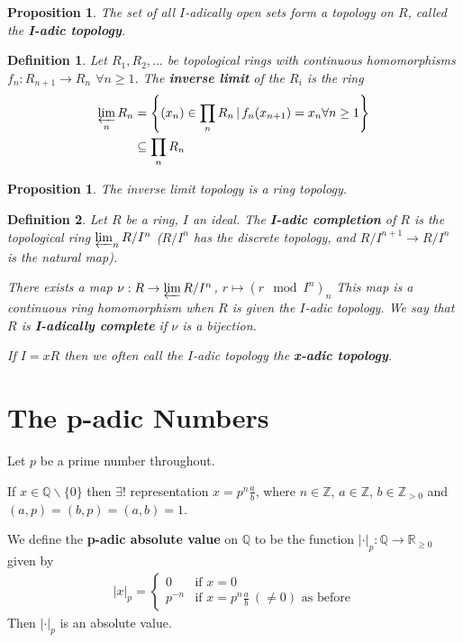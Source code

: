 \documentclass[a4paper]{article}
\newtheorem*{definition}{Definition}
\newtheorem{prop}[lemma]{Proposition}
\newcommand*\abs[1]{\left|#1\right|}
\begin{document}
\begin{prop}
	The set of all $I$-adically open sets form a topology on $R$, called the \textbf{I-adic topology}.
\end{prop}

\begin{definition}
	Let $R_1, R_2, \dots$ be topological rings with continuous homomorphisms $f_n:R_{n+1}\to R_n$ $\forall n \geq 1$. The \textbf{inverse limit} of the $R_i$ is the ring
	\begin{align*}
		\varprojlim_n R_n &= \left\{(x_n) \in \prod_n R_n \,|\, f_n(x_{n+1})=x_n \forall n \geq 1  \right\}\\
		&\subseteq \prod_n R_n
	\end{align*}
\end{definition}

\begin{prop}
	The inverse limit topology is a ring topology.
\end{prop}

\begin{definition}
	Let $R$ be a ring, $I$ an ideal. The \textbf{I-adic completion} of $R$ is the topological ring $\varprojlim_n R/I^n$ ($R/I^n$ has the discrete topology, and $R/I^{n+1} \to R/I^{n}$ is the natural map).
	
	There exists a map $\nu: R \to \varprojlim R/I^n$, $r \mapsto (r \mod I^n)_n$ This map is a continuous ring homomorphism when $R$ is given the $I$-adic topology. We say that $R$ is \textbf{I-adically complete} if $\nu$ is a bijection.
	
	If $I=xR$ then we often call the $I$-adic topology the \textbf{x-adic topology}.
\end{definition}

\section{The p-adic Numbers}
Let $p$ be a prime number throughout.

If $x \in \mathbb{Q} \backslash \{0\}$ then $\exists!$ representation $x=p^n \frac{a}{b}$, where $n \in \mathbb{Z}$, $a \in \mathbb{Z}$, $b \in \mathbb{Z}_{>0}$ and $(a,p)=(b,p)=(a,b)=1$.

We define the \textbf{p-adic absolute value} on $\mathbb{Q}$ to be the function $\abs{\cdot}_p: \mathbb{Q} \to \mathbb{R}_{\geq 0}$ given by
\begin{align*}
	\abs{x}_p =
	\begin{cases}
	0 &\text{if } x=0\\
	p^{-n}  &\text{if } x=p^n \frac{a}{b}\ (\neq 0) \text{ as before}
	\end{cases}
\end{align*}
Then $\abs{\cdot}_p$ is an absolute value.
\end{document}

